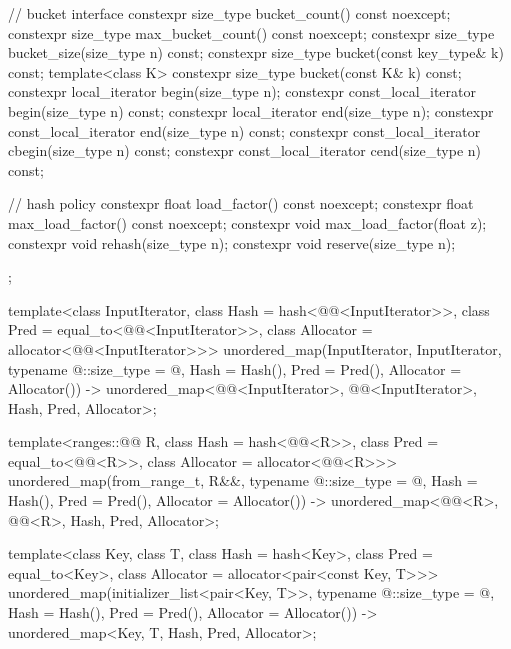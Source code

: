 \begin{codeblock}
{{    // bucket interface
    constexpr size_type bucket_count() const noexcept;
    constexpr size_type max_bucket_count() const noexcept;
    constexpr size_type bucket_size(size_type n) const;
    constexpr size_type bucket(const key_type& k) const;
    template<class K> constexpr size_type bucket(const K& k) const;
    constexpr local_iterator begin(size_type n);
    constexpr const_local_iterator begin(size_type n) const;
    constexpr local_iterator end(size_type n);
    constexpr const_local_iterator end(size_type n) const;
    constexpr const_local_iterator cbegin(size_type n) const;
    constexpr const_local_iterator cend(size_type n) const;

    // hash policy
    constexpr float load_factor() const noexcept;
    constexpr float max_load_factor() const noexcept;
    constexpr void max_load_factor(float z);
    constexpr void rehash(size_type n);
    constexpr void reserve(size_type n);
  };

  template<class InputIterator,
           class Hash = hash<@@<InputIterator>>,
           class Pred = equal_to<@@<InputIterator>>,
           class Allocator = allocator<@@<InputIterator>>>
    unordered_map(InputIterator, InputIterator, typename @\seebelow@::size_type = @\seebelow@,
                  Hash = Hash(), Pred = Pred(), Allocator = Allocator())
      -> unordered_map<@@<InputIterator>, @@<InputIterator>, Hash, Pred,
                       Allocator>;

  template<ranges::@@ R, class Hash = hash<@@<R>>,
           class Pred = equal_to<@@<R>>,
           class Allocator = allocator<@@<R>>>
    unordered_map(from_range_t, R&&, typename @\seebelow@::size_type = @\seebelow@,
                  Hash = Hash(), Pred = Pred(), Allocator = Allocator())
      -> unordered_map<@@<R>, @@<R>, Hash, Pred, Allocator>;

  template<class Key, class T, class Hash = hash<Key>,
           class Pred = equal_to<Key>, class Allocator = allocator<pair<const Key, T>>>
    unordered_map(initializer_list<pair<Key, T>>,
                  typename @\seebelow@::size_type = @\seebelow@, Hash = Hash(),
                  Pred = Pred(), Allocator = Allocator())
      -> unordered_map<Key, T, Hash, Pred, Allocator>;

}
\end{codeblock}
